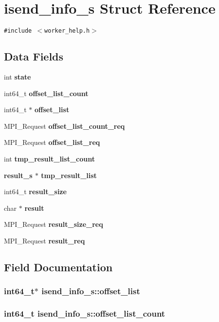\section{isend\_\-info\_\-s Struct Reference}
\label{structisend__info__s}
{\tt \#include $<$worker\_\-help.h$>$}

\subsection*{Data Fields}
\begin{CompactItemize}
\item 
int \bf{state}
\item 
int64\_\-t \bf{offset\_\-list\_\-count}
\item 
int64\_\-t $\ast$ \bf{offset\_\-list}
\item 
MPI\_\-Request \bf{offset\_\-list\_\-count\_\-req}
\item 
MPI\_\-Request \bf{offset\_\-list\_\-req}
\item 
int \bf{tmp\_\-result\_\-list\_\-count}
\item 
\bf{result\_\-s} $\ast$ \bf{tmp\_\-result\_\-list}
\item 
int64\_\-t \bf{result\_\-size}
\item 
char $\ast$ \bf{result}
\item 
MPI\_\-Request \bf{result\_\-size\_\-req}
\item 
MPI\_\-Request \bf{result\_\-req}
\end{CompactItemize}


\subsection{Field Documentation}
\subsubsection{\setlength{\rightskip}{0pt plus 5cm}int64\_\-t$\ast$ \bf{isend\_\-info\_\-s::offset\_\-list}}\label{structisend__info__s_3a36c0b87f50f1ea92ae0ca27f5bb59e}


\subsubsection{\setlength{\rightskip}{0pt plus 5cm}int64\_\-t \bf{isend\_\-info\_\-s::offset\_\-list\_\-count}}\label{structisend__info__s_40efa3284a8c6120d2eaa37ed7f22899}


